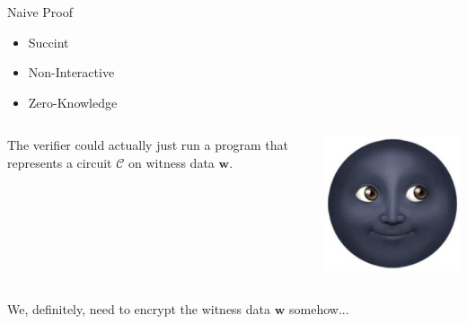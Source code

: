 \documentclass{zkdl-presentation-template}
\begin{document}
    \begin{frame}{Naive Proof}
        \begin{itemize}
            \item[\ding{55}] Succint
            \item[\ding{51}] Non-Interactive
            \item[\ding{55}] Zero-Knowledge
        \end{itemize}

        \pause
        \vspace{20pt}
        \begin{columns}
            \begin{column}{0.7\textwidth}
                The verifier could actually just run a program that represents a circuit 
                $\mathcal{C}$ on witness data $\boldsymbol{w}$.
            \end{column}

            \begin{column}{0.2\textwidth}
                \includegraphics[width=\linewidth]{../presentations/images/common/new-moon-with-face.jpg}
            \end{column}
        \end{columns}\pause

        We, definitely, need to encrypt the witness data $\boldsymbol{w}$ somehow...
    \end{frame}
\end{document}
